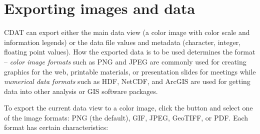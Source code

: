 \section{Exporting images and data}
\label{exporting}

CDAT can export either the main data view (a color image with
color scale and information legends) or the data file values and
metadata (character, integer, floating point values).  How the
exported data is to be used determines the format -- {\em color
image formats} such as PNG and JPEG are commonly used for
creating graphics for the web, printable materials, or
presentation slides for meetings while {\em numerical data
formats} such as HDF, NetCDF, and ArcGIS are used for getting data into
other analysis or GIS software packages.

To export the current data view to a color image, click the
 button and select one of the image
formats: PNG (the default), GIF, JPEG, GeoTIFF, or PDF.  Each
format has certain characteristics:
